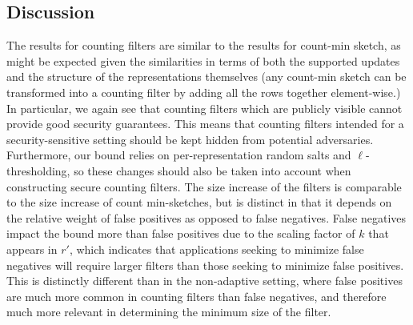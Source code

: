 \subsection{Discussion}
The results for counting filters are similar to the results for count-min
sketch, as might be expected given the similarities in terms of both the
supported updates and the structure of the representations themselves (any
count-min sketch can be transformed into a counting filter by adding all the
rows together element-wise.) In particular, we again see that counting filters
which are publicly visible cannot provide good security guarantees. This means
that counting filters intended for a security-sensitive setting should be kept
hidden from potential adversaries. Furthermore, our bound relies on
per-representation random salts and $\ell$-thresholding, so these changes should
also be taken into account when constructing secure counting filters. The size
increase of the filters is comparable to the size increase of count
min-sketches, but is distinct in that it depends on the relative weight of false
positives as opposed to false negatives. False negatives impact the bound more
than false positives due to the scaling factor of $k$ that appears in $r'$,
which indicates that applications seeking to minimize false negatives will
require larger filters than those seeking to minimize false positives. This is
distinctly different than in the non-adaptive setting, where false positives are
much more common in counting filters than false negatives, and therefore much
more relevant in determining the minimum size of the filter.